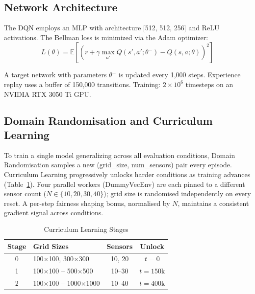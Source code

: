 \documentclass[conference]{IEEEtran}
\begin{document}
\subsection{Network Architecture}

The DQN employs an MLP with architecture [512, 512, 256] and ReLU activations. The Bellman loss is minimized via the Adam optimizer:
\begin{equation}
L(\theta) = \mathbb{E}\!\left[\!\left(r + \gamma \max_{a'} Q(s', a'; \theta^-) - Q(s, a; \theta)\right)^2\right]
\label{eq:bellman}
\end{equation}

A target network with parameters $\theta^-$ is updated every 1{,}000 steps. Experience replay uses a buffer of 150{,}000 transitions. Training: $2 \times 10^6$ timesteps on an NVIDIA RTX 3050 Ti GPU.

\subsection{Domain Randomisation and Curriculum Learning}

To train a single model generalizing across all evaluation conditions, Domain Randomisation samples a new (grid\_size, num\_sensors) pair every episode. Curriculum Learning progressively unlocks harder conditions as training advances (Table~\ref{tab:curriculum}). Four parallel workers (DummyVecEnv) are each pinned to a different sensor count ($N \in \{10, 20, 30, 40\}$); grid size is randomised independently on every reset. A per-step fairness shaping bonus, normalised by $N$, maintains a consistent gradient signal across conditions.

\begin{table}[htbp]
\caption{Curriculum Learning Stages}
\begin{center}
\begin{tabular}{|c|l|c|c|}
\hline
\textbf{Stage} & \textbf{Grid Sizes} & \textbf{Sensors} & \textbf{Unlock} \\
\hline
0 & 100$\times$100, 300$\times$300 & 10, 20 & $t = 0$ \\
1 & 100$\times$100 -- 500$\times$500 & 10--30 & $t = 150\text{k}$ \\
2 & 100$\times$100 -- 1000$\times$1000 & 10--40 & $t = 400\text{k}$ \\
\hline
\end{tabular}
\label{tab:curriculum}
\end{center}
\end{table}
\end{document}
